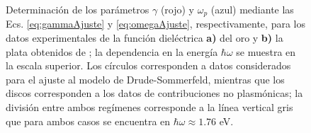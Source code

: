 \begin{figure}[h!]
\begin{subfigure}{.45\linewidth}
	\end{subfigure}\vspace*{-.7em}
	\caption{ Determinación de los parámetros $\gamma$ (rojo) y $\omega_p$ (azul) mediante las Ecs. \eqref{eq:gammaAjuste} y \eqref{eq:omegaAjuste}, respectivamente, para los datos experimentales de la función dieléctrica \textbf{a)} del oro y \textbf{b)} la plata obtenidos de \cite{johnson1972constants}; la dependencia en la energía $\hbar\omega$ se muestra en la escala superior. Los círculos corresponden a datos considerados para el ajuste al modelo de Drude-Sommerfeld, mientras que los discos corresponden a los datos de contribuciones no plasmónicas; la división entre ambos regímenes corresponde a la línea vertical gris que para ambos casos se encuentra en $\hbar\omega\approx 1.76$ eV.}\label{fig:FitDrude}
	\end{figure}	


